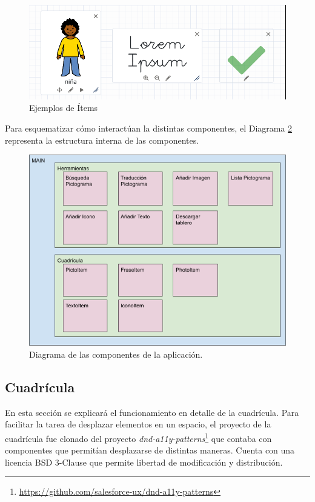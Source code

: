 	

\begin{figure}[h!]
	\centering
	\includegraphics[width=0.7\linewidth]{Imagenes/Bitmap/items}
	\caption{Ejemplos de Ítems}
	\label{fig:items}
\end{figure}
	

Para esquematizar cómo interactúan la distintas componentes, el Diagrama \ref{fig:diagramaarquitectura} representa la estructura interna de las componentes.

\begin{figure}[h!]
	\centering
	\includegraphics[width=\linewidth]{Imagenes/Bitmap/diagramaarquitectura}
	\caption{Diagrama de las componentes de la aplicación.}
	\label{fig:diagramaarquitectura}
\end{figure}


\subsection{Cuadrícula}
\label{cap5:cuadricula}

En esta sección se explicará el funcionamiento en detalle de la cuadrícula. Para facilitar la tarea de desplazar elementos en un espacio, el proyecto de la cuadrícula fue clonado del proyecto  \textit{dnd-a11y-patterns}\footnote{\url{https://github.com/salesforce-ux/dnd-a11y-patterns}} que contaba con componentes que permitían desplazarse de distintas maneras. Cuenta con una licencia BSD 3-Clause que permite libertad de modificación y distribución.


